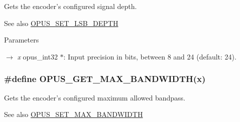 Gets the encoder's configured signal depth. \begin{DoxySeeAlso}{See also}
\hyperlink{group__opus__encoderctls_gaa23940eb477ff617edc14b8d66e104c0}{OPUS\_\-SET\_\-LSB\_\-DEPTH} 
\end{DoxySeeAlso}

\begin{DoxyParams}{Parameters}
\item[\mbox{$\rightarrow$} {\em x}]{\ttfamily opus\_\-int32 $\ast$}: Input precision in bits, between 8 and 24 (default: 24). \end{DoxyParams}
\hypertarget{group__opus__encoderctls_gaa3b5736de64792e1144ce12dfb87613c}{
\subsubsection[{OPUS\_\-GET\_\-MAX\_\-BANDWIDTH}]{\setlength{\rightskip}{0pt plus 5cm}\#define OPUS\_\-GET\_\-MAX\_\-BANDWIDTH(x)}}
\label{group__opus__encoderctls_gaa3b5736de64792e1144ce12dfb87613c}


Gets the encoder's configured maximum allowed bandpass. \begin{DoxySeeAlso}{See also}
\hyperlink{group__opus__encoderctls_ga4f88288e89c595c07c61db316cc45289}{OPUS\_\-SET\_\-MAX\_\-BANDWIDTH} 
\end{DoxySeeAlso}

